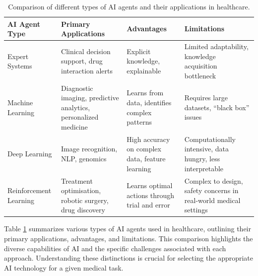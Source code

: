 \documentclass[12pt,a4paper]{article}
\begin{document}
\begin{table}[H]
    \centering
    \caption{Comparison of different types of AI agents and their applications in healthcare.}
    \label{tab:ai_agent_types}
    \begin{tabularx}{\textwidth}{>{\raggedright\arraybackslash}p{3cm}
                                  >{\raggedright\arraybackslash}X
                                  >{\raggedright\arraybackslash}X
                                  >{\raggedright\arraybackslash}X}
        \toprule
        \textbf{AI Agent Type} & \textbf{Primary Applications} & \textbf{Advantages} & \textbf{Limitations} \\
        \midrule
        Expert Systems & Clinical decision support, drug interaction alerts & Explicit knowledge, explainable & Limited adaptability, knowledge acquisition bottleneck \\
        \addlinespace
        Machine Learning & Diagnostic imaging, predictive analytics, personalized medicine & Learns from data, identifies complex patterns & Requires large datasets, ``black box'' issues \\
        \addlinespace
        Deep Learning & Image recognition, NLP, genomics & High accuracy on complex data, feature learning & Computationally intensive, data hungry, less interpretable \\
        \addlinespace
        Reinforcement Learning & Treatment optimisation, robotic surgery, drug discovery & Learns optimal actions through trial and error & Complex to design, safety concerns in real-world medical settings \\
        \bottomrule
    \end{tabularx}
\end{table}
Table \ref{tab:ai_agent_types} summarizes various types of AI agents used in healthcare, outlining their primary applications, advantages, and limitations. This comparison highlights the diverse capabilities of AI and the specific challenges associated with each approach. Understanding these distinctions is crucial for selecting the appropriate AI technology for a given medical task.
\end{document}

